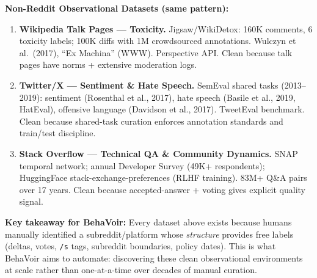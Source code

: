 {\textbf{Non-Reddit Observational Datasets (same pattern):}
\begin{enumerate}
    \item \textbf{Wikipedia Talk Pages --- Toxicity.}
          Jigsaw/WikiDetox: 160K comments, 6 toxicity labels; 100K diffs with 1M
          crowdsourced annotations. Wulczyn et al.\ (2017), ``Ex Machina'' (WWW).
          Perspective API. Clean because talk pages have norms + extensive moderation logs.

    \item \textbf{Twitter/X --- Sentiment \& Hate Speech.}
          SemEval shared tasks (2013--2019): sentiment (Rosenthal et al., 2017),
          hate speech (Basile et al., 2019, HatEval), offensive language (Davidson
          et al., 2017). TweetEval benchmark. Clean because shared-task curation
          enforces annotation standards and train/test discipline.

    \item \textbf{Stack Overflow --- Technical QA \& Community Dynamics.}
          SNAP temporal network; annual Developer Survey (49K+ respondents);
          HuggingFace stack-exchange-preferences (RLHF training). 83M+ Q\&A pairs
          over 17 years. Clean because accepted-answer + voting gives explicit
          quality signal.
\end{enumerate}

\textbf{Key takeaway for BehaVoir:} Every dataset above exists because humans
manually identified a subreddit/platform whose \emph{structure} provides free
labels (deltas, votes, \texttt{/s} tags, subreddit boundaries, policy dates).
This is what BehaVoir aims to automate: discovering these clean observational
environments at scale rather than one-at-a-time over decades of manual curation.}


